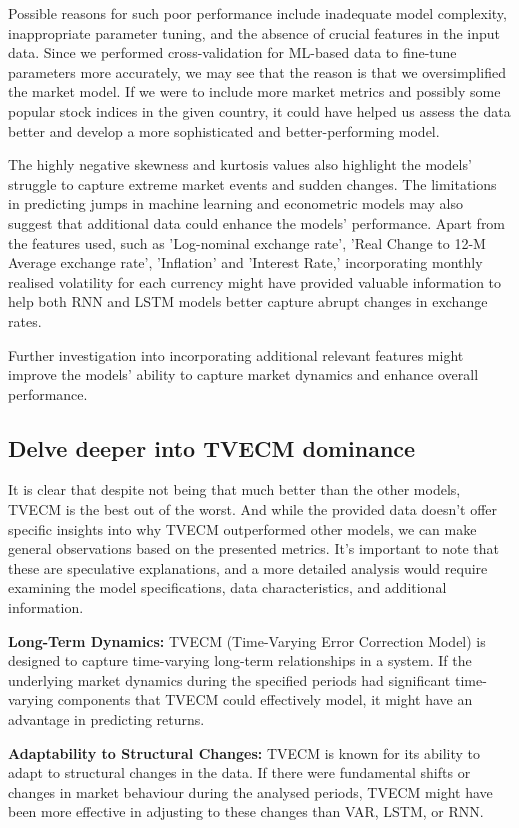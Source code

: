 \documentclass[a4paper,10pt]{article}
\begin{document}
Possible reasons for such poor performance include inadequate model complexity, inappropriate parameter tuning, and the absence of crucial features in the input data. Since we performed cross-validation for ML-based data to fine-tune parameters more accurately, we may see that the reason is that we oversimplified the market model. If we were to include more market metrics and possibly some popular stock indices in the given country, it could have helped us assess the data better and develop a more sophisticated and better-performing model. 

The highly negative skewness and kurtosis values also highlight the models' struggle to capture extreme market events and sudden changes. The limitations in predicting jumps in machine learning and econometric models may also suggest that additional data could enhance the models' performance. Apart from the features used, such as 'Log-nominal exchange rate', 'Real Change to 12-M Average exchange rate', 'Inflation' and 'Interest Rate,' incorporating monthly realised volatility for each currency might have provided valuable information to help both RNN and LSTM models better capture abrupt changes in exchange rates.

Further investigation into incorporating additional relevant features might improve the models' ability to capture market dynamics and enhance overall performance.

\subsection{Delve deeper into TVECM dominance}

It is clear that despite not being that much better than the other models, TVECM is the best out of the worst. And while the provided data doesn't offer specific insights into why TVECM outperformed other models, we can make general observations based on the presented metrics. It's important to note that these are speculative explanations, and a more detailed analysis would require examining the model specifications, data characteristics, and additional information.

\textbf{Long-Term Dynamics:} TVECM (Time-Varying Error Correction Model) is designed to capture time-varying long-term relationships in a system. If the underlying market dynamics during the specified periods had significant time-varying components that TVECM could effectively model, it might have an advantage in predicting returns.

\textbf{Adaptability to Structural Changes:} TVECM is known for its ability to adapt to structural changes in the data. If there were fundamental shifts or changes in market behaviour during the analysed periods, TVECM might have been more effective in adjusting to these changes than VAR, LSTM, or RNN.
\end{document}
